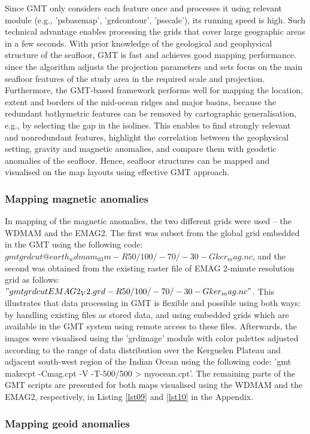 \documentclass[geomatics,article,submit,pdftex,moreauthors]{Definitions/mdpi}
\begin{document}
Since GMT only considers each feature once and processes it using relevant module (e.g., 'psbasemap', 'grdcontour', 'psscale'), its running speed is high. Such technical advantage enables processing the grids that cover large geographic areas in a few seconds. With prior knowledge of the geological and geophysical structure of the seafloor, GMT is fast and achieves good mapping performance. since the algorithm adjusts the projection parameters and sets focus on the main seafloor features of the study area in the required scale and projection. Furthermore, the GMT-based framework performs well for mapping the location, extent and borders of the mid-ocean ridges and major basins, because the redundant bathymetric features can be removed by cartographic generalisation, e.g., by selecting the gap in the isolines. This enables to find strongly relevant and nonredundant features, highlight the correlation between the geophysical setting, gravity and magnetic anomalies, and compare them with geodetic anomalies of the seafloor. Hence, seafloor structures can be mapped and visualised on the map layouts using effective GMT approach. 

\subsubsection{Mapping magnetic anomalies}

In mapping of the magnetic anomalies, the two different grids were used -- the WDMAM and the EMAG2. The first was subset from the global grid embedded in the GMT using the following code: $gmt grdcut @earth_wdmam_03m -R50/100/-70/-30 -Gker_mag.nc$, and the second was obtained from the existing raster file of EMAG 2-minute resolution grid as follows: $"gmt grdcut EMAG2_V2.grd -R50/100/-70/-30 -Gker_mag.nc"$. This illustrates that data processing in GMT is flexible and possible using both ways: by handling existing files as stored data, and using embedded grids which are available in the GMT system using remote access to these files. Afterwards, the images were visualised using the 'grdimage' module with color palettes adjusted according to the range of data distribution over the Kerguelen Plateau and adjacent south-west region of the Indian Ocean using the following code: 'gmt makecpt -Cmag.cpt -V -T-500/500 > myocean.cpt'. The remaining parts of the GMT scripts are presented for both maps visualised using the WDMAM and the EMAG2, respectively, in Listing \ref{lst09} and \ref{lst10} in the Appendix.

\subsubsection{Mapping geoid anomalies}
\end{document}
